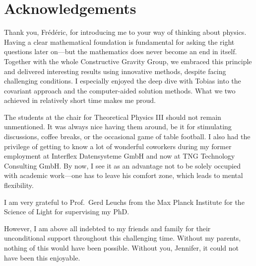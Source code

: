 \chapter{Acknowledgements}

Thank you, Fr\'ed\'eric, for introducing me to your way of thinking about physics. Having a clear mathematical foundation is fundamental for asking the right questions later on---but the mathematics does never become an end in itself. Together with the whole Constructive Gravity Group, we embraced this principle and delivered interesting results using innovative methods, despite facing challenging conditions. I especially enjoyed the deep dive with Tobias into the covariant approach and the computer-aided solution methods. What we two achieved in relatively short time makes me proud.

The students at the chair for Theoretical Physics III should not remain unmentioned. It was always nice having them around, be it for stimulating discussions, coffee breaks, or the occasional game of table football. I also had the privilege of getting to know a lot of wonderful coworkers during my former employment at Interflex Datensysteme GmbH and now at TNG Technology Consulting GmbH. By now, I see it as an advantage not to be solely occupied with academic work---one has to leave his comfort zone, which leads to mental flexibility.

I am very grateful to Prof.~Gerd Leuchs from the Max Planck Institute for the Science of Light for supervising my PhD.

However, I am above all indebted to my friends and family for their unconditional support throughout this challenging time. Without my parents, nothing of this would have been possible. Without you, Jennifer, it could not have been this enjoyable.

